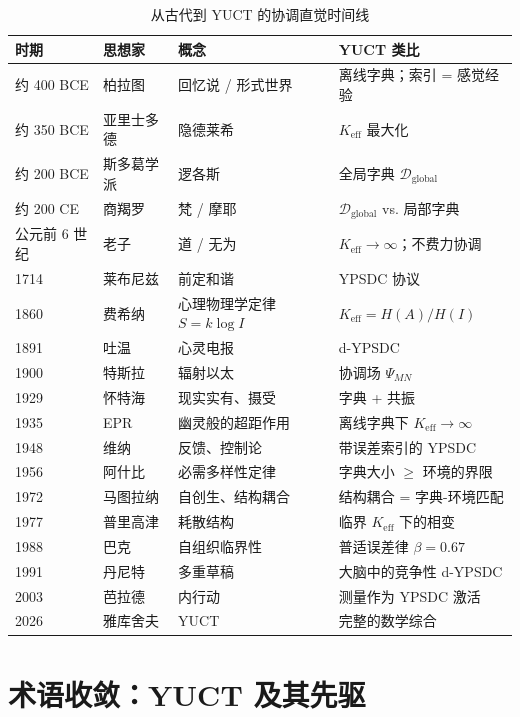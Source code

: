\documentclass[12pt,a4paper]{article}
\begin{document}
	\begin{table}[htbp]
		\centering
		\caption{从古代到 YUCT 的协调直觉时间线}
		\label{tab:timeline}
		\small
		\begin{tabular}{p{1.2cm}p{3cm}p{4.5cm}p{4cm}}
			\toprule
			\textbf{时期} & \textbf{思想家} & \textbf{概念} & \textbf{YUCT 类比} \\
			\midrule
			约 400 BCE & 柏拉图 & 回忆说 / 形式世界 & 离线字典；索引 = 感觉经验 \\
			约 350 BCE & 亚里士多德 & 隐德莱希 & \(K_{\mathrm{eff}}\) 最大化 \\
			约 200 BCE & 斯多葛学派 & 逻各斯 & 全局字典 \(\mathcal{D}_{\text{global}}\) \\
			约 200 CE & 商羯罗 & 梵 / 摩耶 & \(\mathcal{D}_{\text{global}}\) vs. 局部字典 \\
			公元前 6 世纪 & 老子 & 道 / 无为 & \(K_{\mathrm{eff}} \to \infty\)；不费力协调 \\
			1714 & 莱布尼兹 & 前定和谐 & YPSDC 协议 \\
			1860 & 费希纳 & 心理物理学定律 \(S = k \log I\) & \(K_{\mathrm{eff}} = H(A)/H(I)\) \\
			1891 & 吐温 & 心灵电报 & d-YPSDC \\
			1900 & 特斯拉 & 辐射以太 & 协调场 \(\Psi_{MN}\) \\
			1929 & 怀特海 & 现实实有、摄受 & 字典 + 共振 \\
			1935 & EPR & 幽灵般的超距作用 & 离线字典下 \(K_{\mathrm{eff}} \to \infty\) \\
			1948 & 维纳 & 反馈、控制论 & 带误差索引的 YPSDC \\
			1956 & 阿什比 & 必需多样性定律 & 字典大小 \(\ge\) 环境的界限 \\
			1972 & 马图拉纳 & 自创生、结构耦合 & 结构耦合 = 字典-环境匹配 \\
			1977 & 普里高津 & 耗散结构 & 临界 \(K_{\mathrm{eff}}\) 下的相变 \\
			1988 & 巴克 & 自组织临界性 & 普适误差律 \(\beta = 0.67\) \\
			1991 & 丹尼特 & 多重草稿 & 大脑中的竞争性 d-YPSDC \\
			2003 & 芭拉德 & 内行动 & 测量作为 YPSDC 激活 \\
			2026 & 雅库舍夫 & YUCT & 完整的数学综合 \\
			\bottomrule
		\end{tabular}
	\end{table}
	
	\section{术语收敛：YUCT 及其先驱}
	
\end{document}
